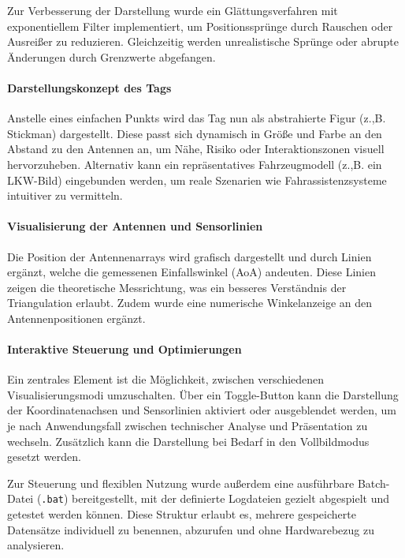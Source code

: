 \documentclass[a4paper, 12pt]{article} %
\begin{document}
Zur Verbesserung der Darstellung wurde ein Glättungsverfahren mit exponentiellem Filter implementiert, um Positionssprünge durch Rauschen oder Ausreißer 
zu reduzieren. Gleichzeitig werden unrealistische Sprünge oder abrupte Änderungen durch Grenzwerte abgefangen.

\paragraph{Darstellungskonzept des Tags}

Anstelle eines einfachen Punkts wird das Tag nun als abstrahierte Figur (z.,B. Stickman) dargestellt. Diese passt sich dynamisch in Größe und Farbe an
 den Abstand zu den Antennen an, um Nähe, Risiko oder Interaktionszonen visuell hervorzuheben. Alternativ kann ein repräsentatives Fahrzeugmodell 
 (z.,B. ein LKW-Bild) eingebunden werden, um reale Szenarien wie Fahrassistenzsysteme intuitiver zu vermitteln.

\paragraph{Visualisierung der Antennen und Sensorlinien}

Die Position der Antennenarrays wird grafisch dargestellt und durch Linien ergänzt, welche die gemessenen Einfallswinkel (AoA) andeuten. Diese Linien 
zeigen die theoretische Messrichtung, was ein besseres Verständnis der Triangulation erlaubt. Zudem wurde eine numerische Winkelanzeige an den 
Antennenpositionen ergänzt.

\paragraph{Interaktive Steuerung und Optimierungen}

Ein zentrales Element ist die Möglichkeit, zwischen verschiedenen Visualisierungsmodi umzuschalten. Über ein Toggle-Button kann die Darstellung der 
Koordinatenachsen und Sensorlinien aktiviert oder ausgeblendet werden, um je nach Anwendungsfall zwischen technischer Analyse und Präsentation zu 
wechseln. Zusätzlich kann die Darstellung bei Bedarf in den Vollbildmodus gesetzt werden.

Zur Steuerung und flexiblen Nutzung wurde außerdem eine ausführbare Batch-Datei (\texttt{.bat}) bereitgestellt, mit der definierte Logdateien gezielt 
abgespielt und getestet werden können. Diese Struktur erlaubt es, mehrere gespeicherte Datensätze individuell zu benennen, abzurufen und ohne 
Hardwarebezug zu analysieren.
\end{document}
